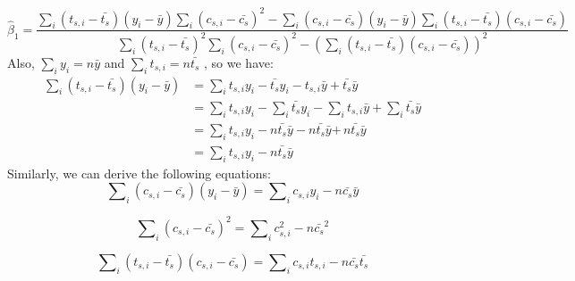 \begin{appendices}
\begin{equation}\label{ap:eq2}
\hat{\beta }_{1}=\frac{\sum\nolimits_i {\left( t_{s,i}-\bar{t_{s}}\right)\left( y_{i}-\bar{y} \right)\sum\nolimits_i \left(c_{s,i}-\bar{c_{s}} \right)^{2} -} \sum\nolimits_i {\left(c_{s,i}-\bar{c_{s}} \right)\left( y_{i}-\bar{y} \right)\sum\nolimits_i{\left( t_{s,i}-\bar{t_{s}} \right)\left( c_{s,i}-\bar{c_{s}} \right)} }}{\sum\nolimits_i {\left( t_{s,i}-\bar{t_{s}} \right)^{2}\sum\nolimits_i\left( c_{s,i}-\bar{c_{s}} \right)^{2} -} \left( \sum\nolimits_i {\left(t_{s,i}-\bar{t_{s}} \right)\left( c_{s,i}-\bar{c_{s}} \right)} \right)^{2}}
\end{equation}
Also, $\sum\nolimits_i {y_{i}=} n\bar{y}$ and $\sum\nolimits_i {t_{s,i}=}n\bar{t_{s}}$ , so we have:
\begin{equation}\label{ap:eq3}
\begin{aligned}
\sum\nolimits_i {\left( t_{s,i}-\bar{t_{s}} \right)\left( y_{i}-\bar{y} \right)} &=\sum\nolimits_i {t_{s,i}y_{i}-\bar{t_{s}}y_{i}-t_{s,i}\bar{y}+\bar{t_{s}}\bar{y}}\\
 &=\sum\nolimits_i {t_{s,i}y_{i}} -\sum\nolimits_i {\bar{t_{s}}y_{i}} -\sum\nolimits_i {t_{s,i}\bar{y}} +\sum\nolimits_i {\bar{t_{s}}\bar{y}}\\
  &=\sum\nolimits_i {t_{s,i}y_{i}} -n\bar{t_{s}}\bar{y}-n\bar{t_{s}}\bar{y}\mathrm{+}\, n\bar{t_{s}}\bar{y}\\
  &=\sum\nolimits_i {t_{s,i}y_{i}} -n\bar{t_{s}}\bar{y}
  \end{aligned}
\end{equation}
Similarly, we can derive the following equations:
\begin{equation}\label{ap:eq4}
\sum\nolimits_i {\left( c_{s,i}-\bar{c_{s}} \right)\left( y_{i}-\bar{y} \right)} =\sum\nolimits_i {c_{s,i}y_{i}} -n\bar{c_{s}}\bar{y}
\end{equation}

\begin{equation}\label{ap:eq5}
\sum\nolimits_i \left( c_{s,i}-\bar{c_{s}} \right)^{2} =\sum\nolimits_i c_{s,i}^{2} -n\bar{c_{s}}^{2}
\end{equation}

\begin{equation}\label{ap:eq6}
\sum\nolimits_i {\left( t_{s,i}-\bar{t_{s}} \right)\left( c_{s,i}-\bar{c_{s}} \right)} =\sum\nolimits_i {c_{s,i}t_{s,i}} -n\bar{c_{s}}\bar{t_{s}}
\end{equation}


\end{appendices}
